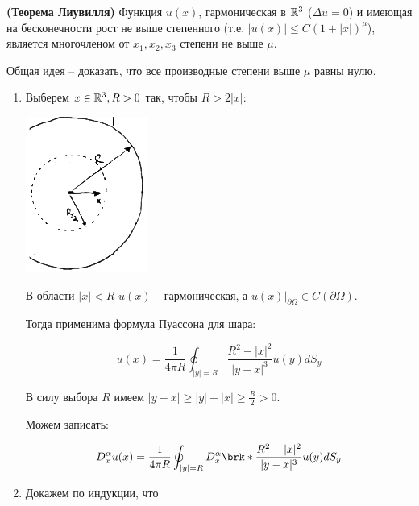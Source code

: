 
\begin{theorem}

{\bf (Теорема Лиувилля)} Функция $u(x)$, гармоническая в $\mathbb{R}^3$ ($\Delta u = 0$)  и имеющая на бесконечности рост не выше степенного (т.е. $|u(x)| \le C (1+|x|)^{\mu}$), является многочленом от $x_1,x_2,x_3$ степени не выше $\mu$.

\end{theorem}


Общая идея -- доказать, что все производные степени выше $\mu$ равны нулю.


\begin{enumerate}



\item{

Выберем $x \in \mathbb{R}^3, R>0$ так, чтобы $R > 2|x|$:
\begin{center}
\includegraphics{21_2_new}
\end{center}
В области $|x|<R$ $u(x)$ -- гармоническая, а $\left. u(x) \right|_{\partial \Omega} \in C(\partial \Omega)$.

Тогда применима формула Пуассона для шара:

$$u(x) = \frac{1}{4 \pi R} \oint_{|y|=R}{\frac{R^2-|x|^2}{|y-x|^3} u(y) dS_y }
$$

В силу выбора $R$ имеем $|y-x| \ge |y|- |x| \ge \frac{R}{2} >0$.

Можем записать:

$$D_{x}^{\alpha} u(x) = \frac{1}{4 \pi R} 
\oint_{|y|=R}{D_{x}^{\alpha}\brk*{\frac{R^2-|x|^2}{|y-x|^3}}u(y) dS_y}$$

}





\item{

Докажем по индукции, что
 
}
\end{enumerate}
